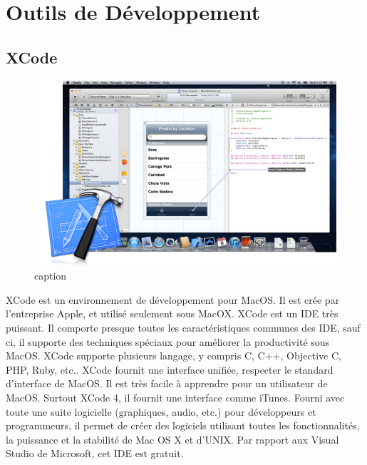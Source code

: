
\section{Outils de Développement} %
\label{sec:outils_de_développement}

\subsection{XCode} %
\label{sub:xcode}

\begin{figure}[htbp]
	\centering
		\includegraphics[width=6in]{Image/tools_overview_xcode_20110711.jpg}
	\caption{caption}
	\label{fig:Image_tools_overview_xcode_20110711}
\end{figure}

XCode est un environnement de développement pour MacOS. Il est crée par l'entreprise Apple, et utilisé seulement sous MacOX. XCode est un IDE très puissant. Il comporte presque toutes les caractéristiques communes des IDE, sauf ci, il supporte des techniques spéciaux pour améliorer la productivité sous MacOS. XCode supporte plusieurs langage, y compris C, C++, Objective C, PHP, Ruby, etc.. XCode fournit une interface unifiée, respecter le standard d'interface de MacOS. Il est très facile à apprendre pour un utilisateur de MacOS. Surtout XCode 4, il fournit une interface comme iTunes. Fourni avec toute une suite logicielle (graphiques, audio, etc.) pour développeurs et programmeurs, il permet de créer des logiciels utilisant toutes les fonctionnalités, la puissance et la stabilité de Mac OS X et d'UNIX. Par rapport aux Visual Studio de Microsoft, cet IDE est gratuit.

